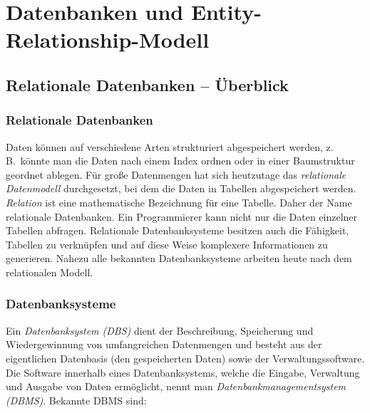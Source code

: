 \chapter{Datenbanken und Entity-Relationship-Modell}
\renewcommand{\chaptertitle}{Datenbanken -- Einführung und Entity-Relationship-Modell}

\lehead[]{\normalfont\sffamily\hspace*{-2.00cm}\textcolor{white}{\colorbox{lightblue}{\makebox[1.60cm][r]{\thechapter}}}\hspace{0.17cm}\textcolor{lightblue}{\chaptertitle}}
\rohead[]{\textcolor{lightblue}{\chaptertitle}\normalfont\sffamily\hspace*{0.17cm}\textcolor{white}{\colorbox{lightblue}{\makebox[1.60cm][l]{\thechapter}}}\hspace{-2.00cm}}
\rehead[]{\textcolor{lightblue}{AvHG, Inf, My}}
\lohead[]{\textcolor{lightblue}{AvHG, Inf, My}}


\section{Relationale Datenbanken -- Überblick}

\subsection{Relationale Datenbanken}

Daten können auf verschiedene Arten strukturiert abgespeichert werden, z.\,B.\
könnte man die Daten nach einem Index ordnen oder in einer Baumstruktur geordnet
ablegen. Für große Datenmengen hat sich heutzutage das \emph{relationale
Datenmodell} durchgesetzt, bei dem die Daten in Tabellen abgespeichert werden.
\textit{Relation} ist eine mathematische Bezeichnung für eine Tabelle.
Daher der Name relationale Datenbanken. Ein Programmierer kann nicht nur die
Daten einzelner Tabellen abfragen. Relationale Datenbanksysteme besitzen auch
die Fähigkeit, Tabellen zu verknüpfen und auf diese Weise komplexere
Informationen zu generieren. Nahezu alle bekannten Datenbanksysteme arbeiten
heute nach dem relationalen Modell.

\subsection{Datenbanksysteme}

Ein \emph{Datenbanksystem (DBS)} dient der Beschreibung, Speicherung und
Wiedergewinnung von umfangreichen Datenmengen und besteht aus der eigentlichen
Datenbasis (den gespeicherten Daten) sowie der Verwaltungssoftware. Die Software
innerhalb eines Datenbanksystems, welche die Eingabe, Verwaltung und Ausgabe von
Daten ermöglicht, nennt man \emph{Datenbankmanagementsystem (DBMS)}. Bekannte
DBMS sind:

